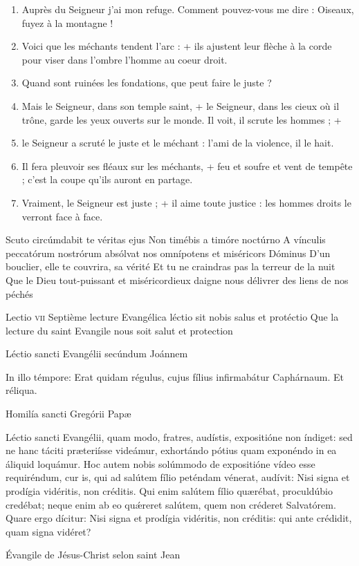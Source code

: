 \documentclass[twoside]{article}
\begin{document}
\begin{paracol}[1]{2}
\begin{enumerate}[wide, itemsep=0mm, labelwidth=!, labelindent=0pt, label=\color{gregoriocolor}\theenumi]
\item Auprès du Seigneur j'ai mon refuge. Comment pouvez-vous me dire : Oiseaux, fuyez à la montagne !
\item Voici que les méchants tendent l'arc : + ils ajustent leur flèche à la corde pour viser dans l'ombre l'homme au coeur droit.
\item Quand sont ruinées les fondations, que peut faire le juste ?
\item Mais le Seigneur, dans son temple saint, + le Seigneur, dans les cieux où il trône, garde les yeux ouverts sur le monde. Il voit, il scrute les hommes ; +
\item le Seigneur a scruté le juste et le méchant : l'ami de la violence, il le hait.
\item Il fera pleuvoir ses fléaux sur les méchants, + feu et soufre et vent de tempête ; c'est la coupe qu'ils auront en partage.
\item Vraiment, le Seigneur est juste ; + il aime toute justice : les hommes droits le verront face à face.
\end{enumerate}

\switchcolumn*

\versiculusabsolutio
	{Scuto circúmdabit te véritas ejus}
	{Non timébis a timóre noctúrno}
	{A vínculis peccatórum nostrórum absólvat nos omnípotens et miséricors Dóminus}
	{D’un bouclier, elle te couvrira, sa vérité}
	{Et tu ne craindras pas la terreur de la nuit}
	{Que le Dieu tout-puissant et miséricordieux daigne nous délivrer des liens de nos péchés}

\lectioresponsorium
	{Lectio \textsc{vii}}
	{Septième lecture}
	{Evangélica léctio sit nobis salus et protéctio}
	{Que la lecture du saint Evangile nous soit salut et protection}
	{
		Léctio sancti Evangélii secúndum Joánnem
		
		In illo témpore: Erat quidam régulus, cujus fílius infirmabátur Caphárnaum. Et réliqua.

		Homilía sancti Gregórii Papæ

		Léctio sancti Evangélii, quam modo, fratres, audístis, expositióne non índiget: sed ne hanc táciti præteriísse videámur, exhortándo pótius quam exponéndo in ea áliquid loquámur. Hoc autem nobis solúmmodo de expositióne vídeo esse requiréndum, cur is, qui ad salútem fílio peténdam vénerat, audívit: Nisi signa et prodígia vidéritis, non créditis. Qui enim salútem fílio quærébat, proculdúbio credébat; neque enim ab eo quǽreret salútem, quem non créderet Salvatórem. Quare ergo dícitur: Nisi signa et prodígia vidéritis, non créditis: qui ante crédidit, quam signa vidéret?
	}
	{
		Évangile de Jésus-Christ selon saint Jean
		
}
\end{paracol}
\end{document}
